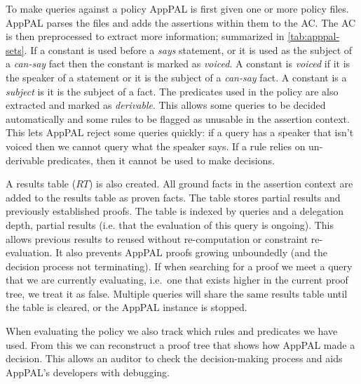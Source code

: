 \documentclass[thesis.tex]{subfiles}
\begin{document}
To make queries against a policy AppPAL is first given one or more policy files.
AppPAL parses the files and adds the assertions within them to the \ac{AC}. The
AC is then preprocessed to extract more information; summarized in
\autoref{tab:apppal-sets}. If a constant is used before a \emph{says} statement,
or it is used as the subject of a \emph{can-say} fact then the constant is
marked as \emph{voiced}. A constant is \emph{voiced} if it is the speaker of a
statement or it is the subject of a \emph{can-say} fact. A constant is a
\emph{subject} is it is the subject of a fact. The predicates used in the policy
are also extracted and marked as \emph{derivable}. This allows some queries to
be decided automatically and some rules to be flagged as unusable in the
assertion context. This lets AppPAL reject some queries quickly: if a query has
a speaker that isn't voiced then we cannot query what the speaker says. If a
rule relies on un-derivable predicates, then it cannot be used to make decisions.

A results table ($RT$) is also created. All ground facts in the assertion context are
added to the results table as proven facts. The table stores partial results and
previously established proofs. The table is indexed by queries and a delegation
depth, partial results (i.e. that the evaluation of this query is ongoing). This
allows previous results to reused without re-computation or constraint
re-evaluation. It also prevents AppPAL proofs growing unboundedly (and the
decision process not terminating). If when searching for a proof we meet a query
that we are currently evaluating, i.e.~one that exists higher in the current
proof tree, we treat it as false. Multiple queries will share the same results
table until the table is cleared, or the AppPAL instance is stopped.

When evaluating the policy we also track which rules and predicates we have
used. From this we can reconstruct a proof tree that shows how AppPAL made a
decision. This allows an auditor to check the decision-making process and aids
AppPAL's developers with debugging.
\end{document}
